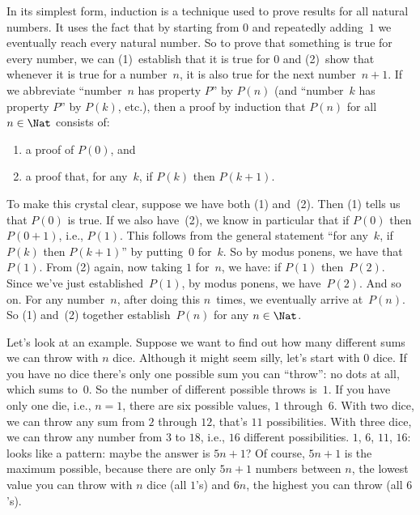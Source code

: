 \documentclass[../../../include/open-logic-section]{subfiles}
\begin{document}


In its simplest form, induction is a technique used to prove results
for all natural numbers. It uses the fact that by starting from $0$
and repeatedly adding~$1$ we eventually reach every natural number. So
to prove that something is true for every number, we can (1)~establish
that it is true for $0$ and (2)~show that whenever it is true for a
number~$n$, it is also true for the next number~$n+1$.  If we
abbreviate ``number~$n$ has property $P$'' by $P(n)$ (and ``number~$k$
has property $P$'' by $P(k)$, etc.), then a proof by induction that
$P(n)$ for all $n \in \Nat$ consists of:
\begin{enumerate}
\item a proof of $P(0)$, and
\item a proof that, for any~$k$, if $P(k)$ then $P(k+1)$.
\end{enumerate}
To make this crystal clear, suppose we have both (1) and~(2).  Then
(1) tells us that $P(0)$ is true.  If we also have~(2), we know in
particular that if $P(0)$ then $P(0+1)$, i.e., $P(1)$. This follows
from the general statement ``for any~$k$, if $P(k)$ then $P(k+1)$'' by
putting~$0$ for~$k$. So by modus ponens, we have that~$P(1)$. From (2)
again, now taking $1$ for~$n$, we have: if $P(1)$ then~$P(2)$. Since
we've just established~$P(1)$, by modus ponens, we have~$P(2)$. And so
on.  For any number~$n$, after doing this $n$~times, we eventually
arrive at~$P(n)$.  So (1) and~(2) together establish~$P(n)$ for any $n
\in \Nat$.

Let's look at an example.  Suppose we want to find out how many
different sums we can throw with $n$ dice.  Although it might seem
silly, let's start with $0$ dice.  If you have no dice there's only one
possible sum you can ``throw'': no dots at all, which sums to~$0$. So
the number of different possible throws is~$1$. If you have only one
die, i.e., $n=1$, there are six possible values, $1$ through~$6$. With
two dice, we can throw any sum from $2$ through $12$, that's $11$
possibilities.  With three dice, we can throw any number from $3$ to
$18$, i.e., $16$ different possibilities.  $1$, $6$, $11$, $16$: looks
like a pattern: maybe the answer is $5n+1$?  Of course, $5n+1$ is the
maximum possible, because there are only $5n+1$ numbers between $n$,
the lowest value you can throw with $n$ dice (all $1$'s) and $6n$, the
highest you can throw (all $6$'s).
\end{document}
